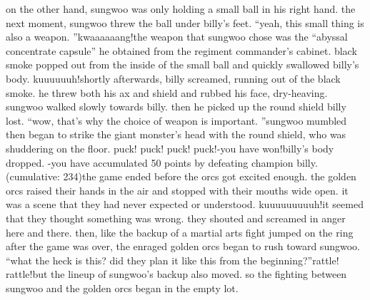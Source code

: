 on the other hand, sungwoo was only holding a small ball in his right hand.
 the next moment, sungwoo threw the ball under billy’s feet.
“yeah, this small thing is also a weapon.
”kwaaaaaang!the weapon that sungwoo chose was the “abyssal concentrate capsule” he obtained from the regiment commander’s cabinet.
 black smoke popped out from the inside of the small ball and quickly swallowed billy’s body.
kuuuuuuh!shortly afterwards, billy screamed, running out of the black smoke.
 he threw both his ax and shield and rubbed his face, dry-heaving.
sungwoo walked slowly towards billy.
 then he picked up the round shield billy lost.
“wow, that’s why the choice of weapon is important.
”sungwoo mumbled then began to strike the giant monster’s head with the round shield, who was shuddering on the floor.
puck! puck! puck! puck!-you have won!billy’s body dropped.
-you have accumulated 50 points by defeating champion billy.
 (cumulative: 234)the game ended before the orcs got excited enough.
the golden orcs raised their hands in the air and stopped with their mouths wide open.
it was a scene that they had never expected or understood.
kuuuuuuuuuh!it seemed that they thought something was wrong.
 they shouted and screamed in anger here and there.
then, like the backup of a martial arts fight jumped on the ring after the game was over, the enraged golden orcs began to rush toward sungwoo.
“what the heck is this? did they plan it like this from the beginning?”rattle! rattle!but the lineup of sungwoo’s backup also moved.
 so the fighting between sungwoo and the golden orcs began in the empty lot.


 